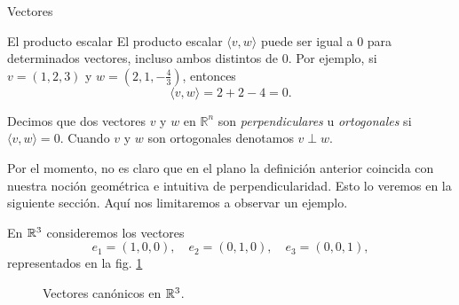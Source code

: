 \begin{chapter}{Vectores}
\begin{section}{El producto escalar}
        El producto escalar $\langle v , w \rangle$ puede ser  igual a 0 para determinados  vectores,  incluso ambos distintos de 0.  Por ejemplo, si $v = (1,2,3)$ y $w = (2, 1, -\frac43)$,  entonces
        \begin{equation*}
            \langle v , w \rangle = 2 + 2 -4 =0.
        \end{equation*}
        \begin{definicion}
            Decimos que dos vectores $v$ y $w$ en $\mathbb R^n$ son  \textit{perpendiculares} u \textit{ortogonales} si  $\langle v , w \rangle=0$. Cuando $v$ y $w$ son ortogonales  denotamos $v \perp w$.
        \end{definicion}
        
        Por el momento, no es claro que en el plano la definición anterior coincida con nuestra noción geométrica e intuitiva de perpendicularidad. Esto lo veremos en la siguiente sección. Aquí nos limitaremos a observar un ejemplo.
        
        \begin{ejemplo*}
            En  $\mathbb R^3$ consideremos los vectores
            \begin{equation*}
            e_1 = (1,0,0),\quad e_2 = (0, 1,0),\quad e_3 = (0,0,1),
            \end{equation*}
            representados en la fig. \ref{fig-canonicos-en-R3}
            \begin{figure}[h]
            	\centering
                \caption{Vectores canónicos en $\mathbb R^3$.}
                \label{fig-canonicos-en-R3}
            \end{figure}
            

\end{ejemplo*}
\end{section}
\end{chapter}
